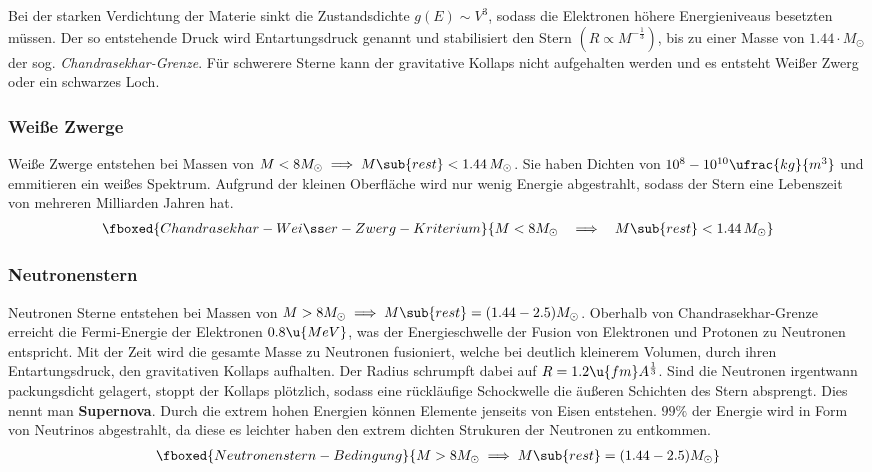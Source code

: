 \documentclass[final]{summery_5.0}
\begin{document}
Bei der starken Verdichtung der Materie sinkt die Zustandsdichte $g(E)\sim V^3$, sodass die Elektronen höhere Energieniveaus besetzten müssen. Der so entstehende Druck wird Entartungsdruck genannt und stabilisiert den Stern $(R\propto M^{-\frac13})$, bis zu einer Masse von $1.44\cdot M_\odot$ der sog. \emph{Chandrasekhar-Grenze}. Für schwerere Sterne kann der gravitative Kollaps nicht aufgehalten werden und es entsteht Weißer Zwerg oder ein schwarzes Loch.   

\subsubsection{Weiße Zwerge}
Weiße Zwerge entstehen bei Massen von $M<8M_\odot\implies M\sub{rest}<1.44\,M_\odot$. Sie haben Dichten von $10^8-10^{10} \ufrac{kg}{m^3}$ und emmitieren ein weißes Spektrum. Aufgrund der kleinen Oberfläche wird nur wenig Energie abgestrahlt, sodass der Stern eine Lebenszeit von mehreren Milliarden Jahren hat.
\begin{align*}
    \fboxed{Chandrasekhar-Weißer-Zwerg-Kriterium}{M<8M_\odot\ \ \implies \ \  M\sub{rest}<1.44 \,M_\odot}
\end{align*}

\subsubsection{Neutronenstern}
Neutronen Sterne entstehen bei Massen von $M>8M_\odot\implies M\sub{rest}=(1.44-2.5)M_\odot$. 
Oberhalb von Chandrasekhar-Grenze erreicht die Fermi-Energie der Elektronen $0.8\u{MeV}$, was der Energieschwelle der Fusion von Elektronen und Protonen zu Neutronen entspricht. 
Mit der Zeit wird die gesamte Masse zu Neutronen fusioniert, welche bei deutlich kleinerem Volumen, durch ihren Entartungsdruck, den gravitativen Kollaps aufhalten.
Der Radius schrumpft dabei auf $R = 1.2\u{fm} A^{\frac13}$. 
Sind die Neutronen irgentwann packungsdicht gelagert, stoppt der Kollaps plötzlich, sodass eine rückläufige Schockwelle die äußeren Schichten des Stern absprengt. Dies nennt man {\bf Supernova}. Durch die extrem hohen Energien können Elemente jenseits von Eisen entstehen. $99\%$ der Energie wird in Form von Neutrinos abgestrahlt, da diese es leichter haben den extrem dichten Strukuren der Neutronen zu entkommen. 
\begin{align*}
    \fboxed{Neutronenstern-Bedingung}{M>8M_\odot\implies M\sub{rest}=(1.44-2.5)M_\odot}
\end{align*}
\end{document}
